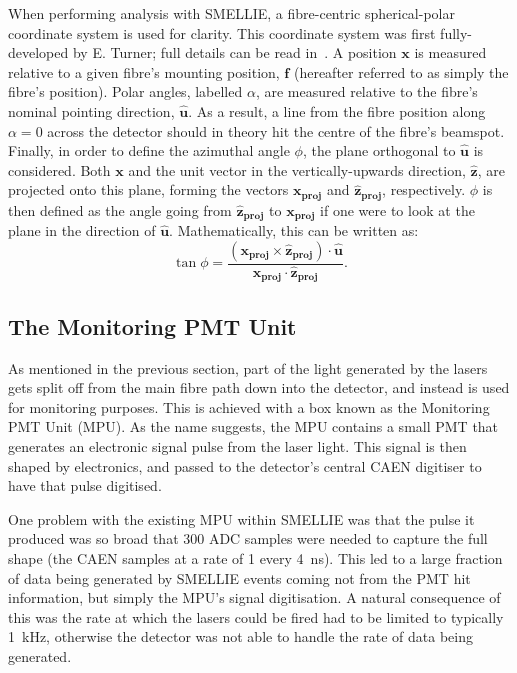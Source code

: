 When performing analysis with SMELLIE, a fibre-centric spherical-polar coordinate system is used for clarity. This coordinate system was first fully-developed by E. Turner; full details can be read in~\cite{turnerMeasurementScatteringCharacteristics2022}. A position $\bm{x}$ is measured relative to a given fibre's mounting position, $\bm{f}$ (hereafter referred to as simply the fibre's position). Polar angles, labelled $\alpha$, are measured relative to the fibre's nominal pointing direction, $\bm{\hat{u}}$. As a result, a line from the fibre position along $\alpha = 0$ across the detector should in theory hit the centre of the fibre's beamspot. Finally, in order to define the azimuthal angle $\phi$, the plane orthogonal to $\bm{\hat{u}}$ is considered. Both $\bm{x}$ and the unit vector in the vertically-upwards direction, $\bm{\hat{z}}$, are projected onto this plane, forming the vectors $\bm{x_{proj}}$ and $\bm{\hat{z}_{proj}}$, respectively. $\phi$ is then defined as the angle going from $\bm{\hat{z}_{proj}}$ to $\bm{x_{proj}}$ if one were to look at the plane in the direction of $\bm{\hat{u}}$. Mathematically, this can be written as:
\begin{equation}
    \tan\phi = \frac{
        \left(\bm{x_{proj}}\times\bm{\hat{z}_{proj}}\right)\cdot\bm{\hat{u}}
        }{\bm{x_{proj}}\cdot\bm{\hat{z}_{proj}}}.
\end{equation}

\subsection{The Monitoring PMT Unit}\label{sec:smellie_mpu}
As mentioned in the previous section, part of the light generated by the lasers gets split off from the main fibre path down into the detector, and instead is used for monitoring purposes. This is achieved with a box known as the Monitoring PMT Unit (MPU). As the name suggests, the MPU contains a small PMT that generates an electronic signal pulse from the laser light. This signal is then shaped by electronics, and passed to the detector's central CAEN digitiser to have that pulse digitised.

One problem with the existing MPU within SMELLIE was that the pulse it produced was so broad that 300 ADC samples were needed to capture the full shape (the CAEN samples at a rate of 1 every \SI{4}{\ns}). This led to a large fraction of data being generated by SMELLIE events coming not from the PMT hit information, but simply the MPU's signal digitisation. A natural consequence of this was the rate at which the lasers could be fired had to be limited to typically \SI{1}{\kHz}, otherwise the detector was not able to handle the rate of data being generated.

